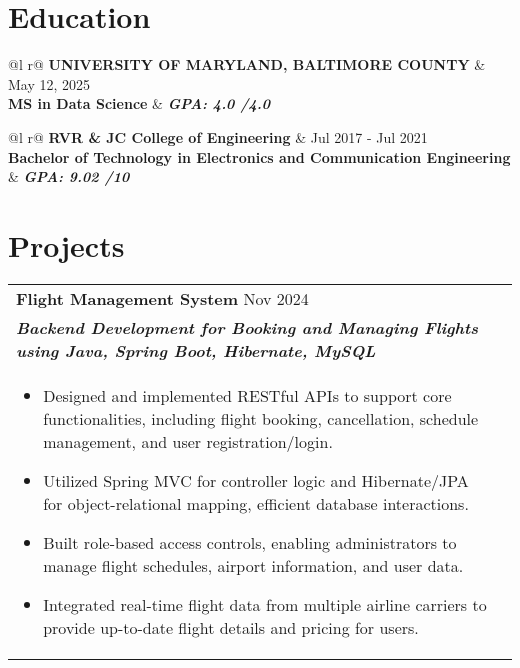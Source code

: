 \documentclass[a4paper,3pt]{article}
\begin{document}
\section{Education}
\begin{tabularx}{\linewidth}{ @{}l r@{} }
\color[HTML]{1C033C} \textbf{UNIVERSITY OF MARYLAND,
BALTIMORE COUNTY} & \hfill  May 12, 2025 \\
\textbf{MS in Data Science} & \hfill \textit{\textbf{GPA: 4.0 /4.0}} \\
\end{tabularx}

\begin{tabularx}{\linewidth}{ @{}l r@{} }
 \textbf{RVR \& JC College of Engineering} & \hfill Jul 2017 - Jul 2021 \\
 \textbf{Bachelor of Technology in Electronics and Communication Engineering} & \hfill \textit{\textbf{GPA: 9.02 /10}} \\
\end{tabularx}

\section{Projects}

\begin{tabularx}{\linewidth}{ @{}l r@{} }
\textbf{Flight Management System} \hspace*{69ex} Nov 2024\\[2pt]
\textbf{\textit{Backend Development for Booking and Managing Flights using Java, Spring Boot, Hibernate, MySQL}} \hfill\\[2pt]
\begin{minipage}[t]{\linewidth}
    \begin{itemize}[nosep,after=\strut, leftmargin=2em, itemsep=2pt]
        \item Designed and implemented RESTful APIs to support core functionalities, including flight booking, cancellation, schedule management, and user registration/login.
\item Utilized Spring MVC for controller logic and Hibernate/JPA for object-relational mapping, efficient database interactions.
\item Built role-based access controls, enabling administrators to manage flight schedules, airport information, and user data.
\item Integrated real-time flight data from multiple airline carriers to provide up-to-date flight details and pricing for users.    
    \end{itemize}
    \end{minipage}
\end{tabularx}
\end{document}
